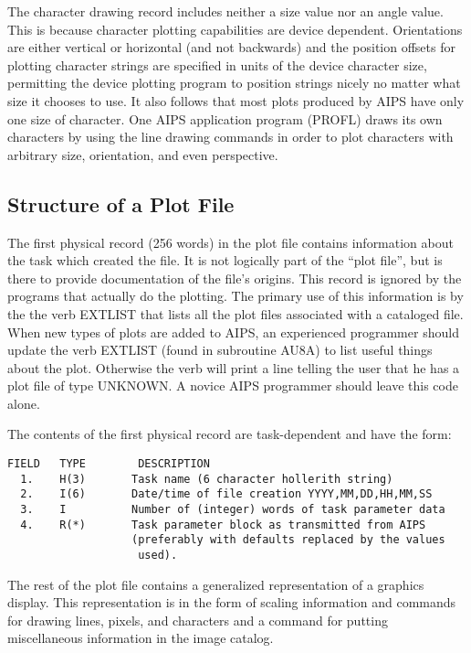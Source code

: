 The character drawing record includes neither a size value nor an
angle value. This is because character plotting capabilities are
device dependent. Orientations are either vertical or horizontal (and
not backwards) and the position offsets for plotting character strings
are specified in units of the device character size, permitting the
device plotting program to position strings nicely no matter what size
it chooses to use. It also follows that most plots produced by AIPS
have only one size of character.  One AIPS application program (PROFL)
draws its own characters by using the line drawing commands in order
to plot characters with arbitrary size, orientation, and even
perspective.

\subsection{Structure of a Plot File}
The first physical record (256 words) in the plot file contains
information about the task which created the file.  It is not
logically part of the ``plot file'', but is there to provide
documentation of the file's origins. This record is ignored by the
programs that actually do the plotting.  The primary use of this
information is by the the verb EXTLIST that lists all the plot files
associated with a cataloged file.  When new types of plots are added
to AIPS, an experienced programmer should update the verb EXTLIST
(found in subroutine AU8A) to list useful things about the plot.
Otherwise the verb will print a line telling the user that he has a
plot file of type UNKNOWN.  A novice AIPS programmer should leave this
code alone.

The contents of the first physical record are task-dependent and have
the form:

\begin{verbatim}
FIELD   TYPE        DESCRIPTION
  1.    H(3)       Task name (6 character hollerith string)
  2.    I(6)       Date/time of file creation YYYY,MM,DD,HH,MM,SS
  3.    I          Number of (integer) words of task parameter data
  4.    R(*)       Task parameter block as transmitted from AIPS
                   (preferably with defaults replaced by the values
                    used).

\end{verbatim}
The rest of the plot file contains a generalized representation of a
graphics display. This representation is in the form of scaling
information and commands for drawing lines, pixels, and characters and
a command for putting miscellaneous information in the image catalog.


